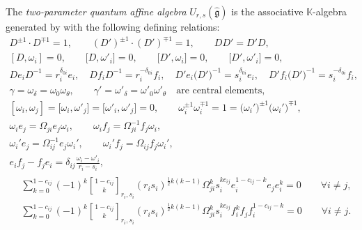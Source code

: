 \documentclass[10pt,a4paper]{amsart}
\numberwithin{equation}{section}
\newcommand{\qbinom}{\genfrac{[}{]}{0pt}{}}
\newcommand{\fg}{\mathfrak{g}}
\newcommand{\UU}{U_{r,s}(\widehat{\fg})}
\begin{document}
\begin{Definition}\label{def:2_param_aff}
The \textit{two-parameter quantum affine algebra} $\UU$ is the associative $\mathbb{K}$-algebra generated by
with the following defining relations:
\begin{gather}
 D^{\pm 1}\cdot D^{\mp 1}=1, \qquad (D')^{\pm 1}\cdot (D')^{\mp 1}=1, \qquad DD'=D'D, \nonumber\\
 [D,\omega_i]=0, \qquad \bigl[D,\omega'_i\bigr]=0, \qquad \bigl[D',\omega_i\bigr]=0, \qquad \bigl[D',\omega'_i\bigr]=0, \nonumber\\
 D e_i D^{-1}=r_i^{\delta_{0i}}e_i, \quad D f_i D^{-1}=r_i^{-\delta_{0i}}f_i, \quad
 D' e_i \bigl(D'\bigr)^{-1}=s_i^{\delta_{0i}}e_i, \quad D' f_i \bigl(D'\bigr)^{-1}=s_i^{-\delta_{0i}}f_i,\nonumber
\\ \label{eq:aR0}
 \gamma=\omega_{\delta}=\omega_0\omega_{\theta},\qquad \gamma'=\omega'_{\delta}=\omega'_0\omega'_{\theta}
\quad \text{are central\ elements},
\\ \label{eq:aR1}
 [\omega_i,\omega_j]=\big[\omega_i,\omega'_j\big]=\big[\omega'_i,\omega'_j\big]=0, \qquad
 \omega_{i}^{\pm 1}\omega_{i}^{\mp 1} = 1 = \bigl(\omega_{i}'\bigr)^{\pm 1}\bigl(\omega_{i}'\bigr)^{\mp 1},
\\ \label{eq:aR2}
 \omega_{i}e_{j} = \Omega_{ji} e_{j}\omega_{i}, \qquad
 \omega_{i}f_{j} = \Omega^{-1}_{ji} f_{j}\omega_{i},
\\ \label{eq:aR3}
 \omega_{i}'e_{j} = \Omega^{-1}_{ij} e_{j}\omega_{i}', \qquad
 \omega_{i}'f_{j} = \Omega_{ij} f_{j}\omega_{i}',
\\ \label{eq:aR4}
 e_{i}f_{j} - f_{j}e_{i} = \delta_{ij}\frac{\omega_i-\omega'_i}{r_{i} - s_{i}},
\\
\begin{aligned}
& \sum_{k = 0}^{1 - c_{ij}} (-1)^k \qbinom{1 - c_{ij}}{k}_{r_{i},s_{i}}
 (r_{i}s_{i})^{\frac{1}{2}k(k - 1)} \Omega_{ji}^{k} s_{i}^{kc_{ij}} e_{i}^{1 - c_{ij} - k}e_{j}e_{i}^{k} = 0
 \qquad \forall i\ne j, \\
& \sum_{k = 0}^{1 - c_{ij}} (-1)^k \qbinom{1 - c_{ij}}{k}_{r_{i},s_{i}}
 (r_{i}s_{i})^{\frac{1}{2}k(k - 1)} \Omega_{ji}^{k} s_{i}^{kc_{ij}} f_{i}^{k}f_{j}f_{i}^{1 - c_{ij} - k} = 0
 \qquad \forall i\ne j.
\end{aligned} \label{eq:aR5}
\end{gather}
\end{Definition}
\end{document}
